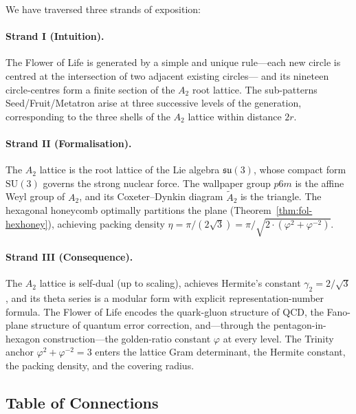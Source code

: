 We have traversed three strands of exposition:

\paragraph{Strand I (Intuition).}
The Flower of Life is generated by a simple and unique rule—each new
circle is centred at the intersection of two adjacent existing circles—
and its nineteen circle-centres form a finite section of the \(A_2\)
root lattice.  The sub-patterns Seed/Fruit/Metatron arise at three
successive levels of the generation, corresponding to the three shells
of the \(A_2\) lattice within distance \(2r\).

\paragraph{Strand II (Formalisation).}
The \(A_2\) lattice is the root lattice of the Lie algebra
\(\mathfrak{su}(3)\), whose compact form \(\mathrm{SU}(3)\) governs the
strong nuclear force.  The wallpaper group \(p6m\) is the affine Weyl
group of \(A_2\), and its Coxeter--Dynkin diagram \(\tilde{A}_2\) is
the triangle.  The hexagonal honeycomb optimally partitions the plane
(Theorem~\ref{thm:fol-hexhoney}), achieving packing density
\(\eta=\pi/(2\sqrt{3})=\pi/\sqrt{2\cdot(\varphi^2+\varphi^{-2})}\).

\paragraph{Strand III (Consequence).}
The \(A_2\) lattice is self-dual (up to scaling), achieves Hermite's
constant \(\gamma_2=2/\sqrt{3}\), and its theta series is a modular form
with explicit representation-number formula.  The Flower of Life encodes
the quark-gluon structure of QCD, the Fano-plane structure of quantum
error correction, and—through the pentagon-in-hexagon construction—the
golden-ratio constant \(\varphi\) at every level.  The Trinity anchor
\(\varphi^2+\varphi^{-2}=3\) enters the lattice Gram determinant,
the Hermite constant, the packing density, and the covering radius.

\subsection{Table of Connections}
\label{subsec:fol-table}

